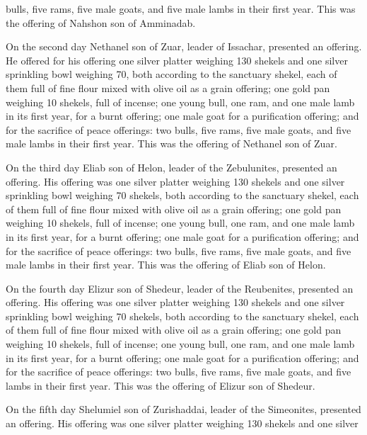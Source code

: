 {bulls,
five
rams,
five
male goats,
and five
male lambs
in their first year.
This
was the offering
of Nahshon
son
of Amminadab.
\par }{\PP {}On the second
day
Nethanel
son
of Zuar,
leader
of Issachar,
presented an offering.
He offered
for his offering
one
silver
platter
weighing 130
shekels
and one
silver
sprinkling bowl
weighing
70,
both according to the sanctuary
shekel,
each of them
full
of fine flour
mixed
with olive oil
as a grain offering;
one
gold
pan
weighing
10
shekels, full
of incense;
one
young
bull,
one ram,
and one
male lamb
in its first
year,
for a burnt offering;
one
male
goat
for a purification offering;
and for the sacrifice
of peace offerings: two
bulls,
five
rams,
five
male goats,
and five
male lambs
in their first year.
This
was the offering
of Nethanel
son
of Zuar.
\par }{\PP {}On
the third
day
Eliab
son
of Helon,
leader
of the Zebulunites, presented an offering.
His offering
was one
silver
platter
weighing 130
shekels
and one
silver
sprinkling bowl
weighing 70
shekels,
both according to the sanctuary
shekel,
each of them
full
of fine flour
mixed
with olive oil
as a grain offering;
one
gold
pan
weighing
10
shekels, full
of incense;
one
young
bull,
one ram,
and one
male lamb
in its first
year,
for a burnt offering;
one
male
goat
for a purification offering;
and for the sacrifice
of peace offerings: two
bulls,
five
rams,
five
male goats,
and five
male lambs
in their first year.
This
was the offering
of Eliab
son
of Helon.
\par }{\PP {}On the fourth
day
Elizur
son
of Shedeur,
leader
of the Reubenites, presented an offering.
His offering
was one
silver
platter
weighing 130
shekels
and one
silver
sprinkling bowl
weighing 70
shekels,
both according to the sanctuary
shekel,
each of them
full
of fine flour
mixed
with olive oil
as a grain offering;
one
gold
pan
weighing
10
shekels, full
of incense;
one
young
bull,
one ram,
and one
male lamb
in its first
year,
for a burnt offering;
one
male
goat
for a purification offering;
and for the sacrifice
of peace offerings: two
bulls,
five
rams,
five
male goats,
and five
lambs
in their first year.
This
was the offering
of Elizur
son
of Shedeur.
\par }{\PP {}On the fifth
day
Shelumiel
son
of Zurishaddai,
leader
of the Simeonites, presented an offering.
His offering
was one
silver
platter
weighing 130
shekels
and one
silver
}

